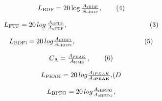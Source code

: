 \documentclass{article}
\begin{document}
\[
$$
L_{\mathrm{B D F}}=2 0 \operatorname{l o g} \frac{A_{\mathrm{t B D F}}} {A_{\mathrm{o B D F}}}, \tag{4}
$$
\]

\[
$$
L_{\mathrm{F T F}}=2 0 \, l o g \, {\frac{A_{t \mathrm{F T F}}} {A_{\mathrm{o F T F}}}}, \qquad\qquad\qquad\qquad\qquad\qquad( 3 )
$$
\]

\[
$$
L_{\mathrm{B D F l}}=2 0 \, l o g {\frac{A_{\mathrm{i B D F l}}} {A_{\mathrm{o B D F l}}}}, \qquad\qquad\qquad\qquad\qquad( 5 )
$$
\]

\[
$$
C_{\mathrm{A}}=\frac{A_{\mathrm{P E A K}}} {A_{\mathrm{R M S}}} \,, \tag{6}
$$
\]

\[
$$
L_{\mathrm{P E A K}}=2 0 \, l o g {\frac{A_{l P E A K}} {A_{o {\bf P E A K}}}},
$$
(D
\]

\[
$$
L_{\mathrm{B P F O}}=2 0 \, l o g {\frac{A_{t \mathrm{B P F O}}} {A_{\mathrm{o B P F O}}}},
$$
\]
\end{document}
